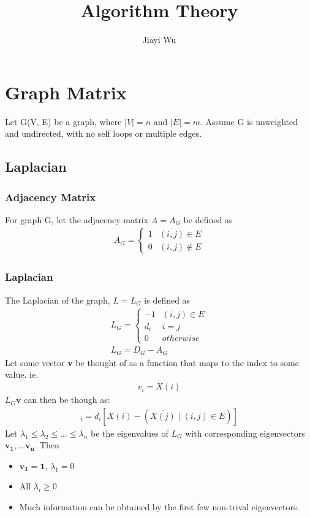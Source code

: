 \documentclass[12pt, letterpaper]{report}
\title{Algorithm Theory}
\author{Jiayi Wu}
\begin{document}
    \maketitle
    \tableofcontents

    \chapter{Graph Matrix}
    Let G(V, E) be a graph, where $|V| = n$ and $|E| = m$. Assume G is unweighted and undirected, with no self loops or multiple edges.
    \section{Laplacian}
    \subsection{Adjacency Matrix}
    For graph G, let the adjacency matrix $A = A_{G}$ be defined as
    \begin{gather*}
        A_{G} = 
        \begin{cases}
            1 & (i, j) \in E\\
            0 & (i, j) \notin E
        \end{cases}
    \end{gather*}


    \subsection{Laplacian}
    The Laplacian of the graph, $L = L_{G}$ is defined as
    \begin{gather*}
        L_{G} = 
        \begin{cases}
            -1 & (i, j) \in E\\
            d_{i} & i = j\\
            0 & otherwise
        \end{cases}
        \\
        L_{G} = D_{G} - A_{G}
    \end{gather*}
    Let some vector \textbf{v} be thought of as a function that maps to the index to some value. ie.
    \begin{gather*}
        v_{i} = X(i)
    \end{gather*}
    $L_{G}\mathbf{v}$ can then be though as:
    \begin{gather*}
        [L_{G}\mathbf{v}]_i = d_i [X(i) - (\overline{X(j)}\mid (i, j) \in E)]
    \end{gather*}
    Let $\lambda_1 \leq \lambda_2 \leq \dots \leq \lambda_{n}$ be the eigenvalues of $L_G$ with corresponding eigenvectors $\mathbf{v_1}, \dots \mathbf{v_n}$. Then
    \begin{itemize}
        \item $\mathbf{v_{1}} = \mathbf{1}$, $\lambda_{1} = 0$
        \item All $\lambda_{i} \geq 0$
        \item Much information can be obtained by the first few non-trival \mbox{eigenvectors}.
    \end{itemize}
\end{document}
